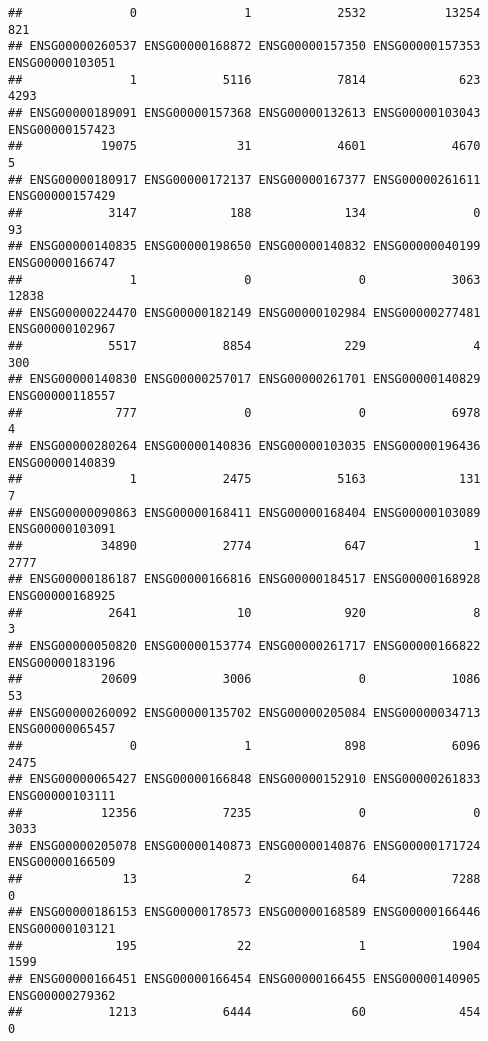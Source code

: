 \documentclass[
]{article}
\begin{document}
\begin{verbatim}
##               0               1            2532           13254             821 
## ENSG00000260537 ENSG00000168872 ENSG00000157350 ENSG00000157353 ENSG00000103051 
##               1            5116            7814             623            4293 
## ENSG00000189091 ENSG00000157368 ENSG00000132613 ENSG00000103043 ENSG00000157423 
##           19075              31            4601            4670               5 
## ENSG00000180917 ENSG00000172137 ENSG00000167377 ENSG00000261611 ENSG00000157429 
##            3147             188             134               0              93 
## ENSG00000140835 ENSG00000198650 ENSG00000140832 ENSG00000040199 ENSG00000166747 
##               1               0               0            3063           12838 
## ENSG00000224470 ENSG00000182149 ENSG00000102984 ENSG00000277481 ENSG00000102967 
##            5517            8854             229               4             300 
## ENSG00000140830 ENSG00000257017 ENSG00000261701 ENSG00000140829 ENSG00000118557 
##             777               0               0            6978               4 
## ENSG00000280264 ENSG00000140836 ENSG00000103035 ENSG00000196436 ENSG00000140839 
##               1            2475            5163             131               7 
## ENSG00000090863 ENSG00000168411 ENSG00000168404 ENSG00000103089 ENSG00000103091 
##           34890            2774             647               1            2777 
## ENSG00000186187 ENSG00000166816 ENSG00000184517 ENSG00000168928 ENSG00000168925 
##            2641              10             920               8               3 
## ENSG00000050820 ENSG00000153774 ENSG00000261717 ENSG00000166822 ENSG00000183196 
##           20609            3006               0            1086              53 
## ENSG00000260092 ENSG00000135702 ENSG00000205084 ENSG00000034713 ENSG00000065457 
##               0               1             898            6096            2475 
## ENSG00000065427 ENSG00000166848 ENSG00000152910 ENSG00000261833 ENSG00000103111 
##           12356            7235               0               0            3033 
## ENSG00000205078 ENSG00000140873 ENSG00000140876 ENSG00000171724 ENSG00000166509 
##              13               2              64            7288               0 
## ENSG00000186153 ENSG00000178573 ENSG00000168589 ENSG00000166446 ENSG00000103121 
##             195              22               1            1904            1599 
## ENSG00000166451 ENSG00000166454 ENSG00000166455 ENSG00000140905 ENSG00000279362 
##            1213            6444              60             454               0 

\end{verbatim}
\end{document}
